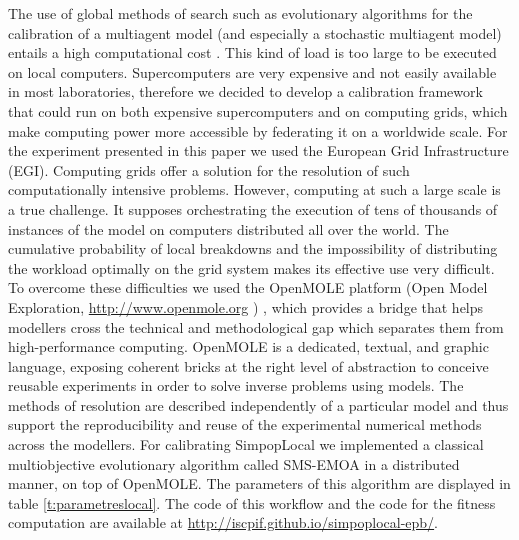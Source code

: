 The use of global methods of search such as evolutionary algorithms for the calibration of a multiagent model (and especially a stochastic multiagent model) entails a high computational cost \autocite{Sharma2006}. This kind of load is too large to be executed on local computers. Supercomputers are very expensive and not easily available in most laboratories, therefore we decided to develop a calibration framework that could run on both expensive supercomputers and on computing grids, which make computing power more accessible by federating it on a worldwide scale. For the experiment presented in this paper we used the European Grid Infrastructure (EGI). Computing grids offer a solution for the resolution of such computationally intensive problems. However, computing at such a large scale is a true challenge. It supposes orchestrating the execution of tens of thousands of instances of the model on computers distributed all over the world. The cumulative probability of local breakdowns and the impossibility of distributing the workload optimally on the grid system makes its effective use very difficult. To overcome these difficulties we used the OpenMOLE platform (Open Model Exploration, \href{http://www.openmole.org}{http://www.openmole.org} ) \autocites{Reuillon2010,Reuillon2013}, which provides a bridge that helps modellers cross the technical and methodological gap which separates them from high-performance computing. OpenMOLE is a dedicated, textual, and graphic language, exposing coherent bricks at the right level of abstraction to conceive reusable experiments in order to solve inverse problems using models. The methods of resolution are described independently of a particular model and thus support the reproducibility and reuse of the experimental numerical methods across the modellers. For calibrating SimpopLocal we implemented a classical multiobjective evolutionary algorithm called SMS-EMOA \autocite{Emmerich2005} in a distributed manner, on top of OpenMOLE. The parameters of this algorithm are displayed in table \ref{t:parametreslocal}. The code of this workflow and the code for the fitness computation are available at \href{http://iscpif.github.io/simpoplocal-epb/}{http://iscpif.github.io/simpoplocal-epb/}.


